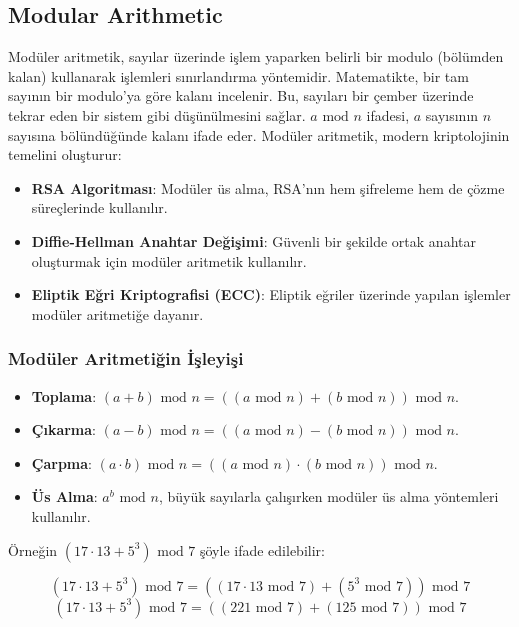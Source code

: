 \subsection{Modular Arithmetic}

Modüler aritmetik, sayılar üzerinde işlem yaparken belirli bir modulo (bölümden kalan) kullanarak işlemleri sınırlandırma yöntemidir. Matematikte, bir tam sayının bir modulo’ya göre kalanı incelenir. Bu, sayıları bir çember üzerinde tekrar eden bir sistem gibi düşünülmesini sağlar. $a \text{ mod } n$ ifadesi, $a$ sayısının $n$ sayısına bölündüğünde kalanı ifade eder. Modüler aritmetik, modern kriptolojinin temelini oluşturur:

\begin{itemize}
    \item \textbf{RSA Algoritması}: Modüler üs alma, RSA'nın hem şifreleme hem de çözme süreçlerinde kullanılır.
    \item \textbf{Diffie-Hellman Anahtar Değişimi}: Güvenli bir şekilde ortak anahtar oluşturmak için modüler aritmetik kullanılır.
    \item \textbf{Eliptik Eğri Kriptografisi (ECC)}: Eliptik eğriler üzerinde yapılan işlemler modüler aritmetiğe dayanır.
\end{itemize}

\subsubsection{Modüler Aritmetiğin İşleyişi}

\begin{itemize}
    \item \textbf{Toplama}: $(a + b) \text{ mod } n = ((a \text{ mod } n) + (b \text{ mod } n)) \text{ mod } n$.
    \item \textbf{Çıkarma}: $(a - b) \text{ mod } n = ((a \text{ mod } n) - (b \text{ mod } n)) \text{ mod } n$.
    \item \textbf{Çarpma}: $(a \cdot b) \text{ mod } n = ((a \text{ mod } n) \cdot (b \text{ mod } n)) \text{ mod } n$.
    \item \textbf{Üs Alma}: $a^b \text{ mod } n$, büyük sayılarla çalışırken modüler üs alma yöntemleri kullanılır.
\end{itemize}

Örneğin $(17 \cdot 13 + 5^3) \text{ mod } 7$ şöyle ifade edilebilir:

\[ (17 \cdot 13 + 5^3) \text{ mod } 7 = ((17 \cdot 13 \text{ mod } 7) + (5^3 \text{ mod } 7)) \text{ mod } 7 \]
\[ (17 \cdot 13 + 5^3) \text{ mod } 7 = ((221 \text{ mod } 7) + (125 \text{ mod } 7)) \text{ mod } 7 \]

